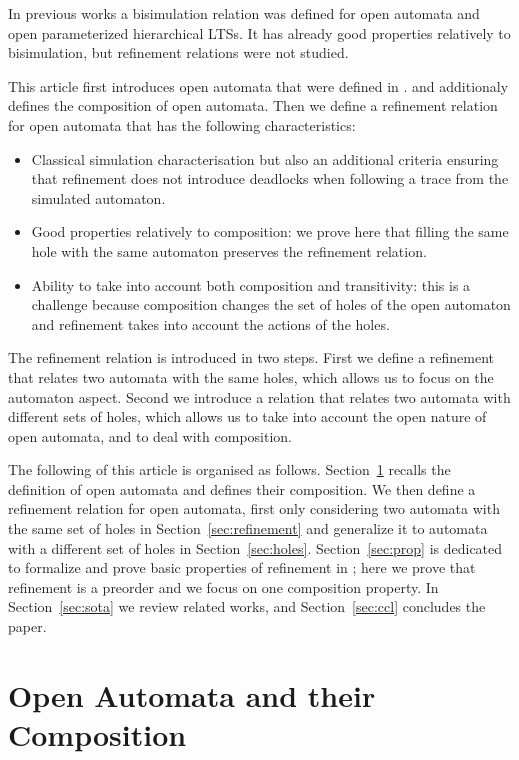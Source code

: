 \documentclass[runningheads]{llncs}
\begin{document}
In previous works \cite{fhbisim,wang:03126313} a bisimulation relation was defined for open automata and open parameterized hierarchical LTSs. It has already good properties relatively to bisimulation, but refinement relations were not studied.

This article first introduces open automata that were defined in  \cite{henrio:01299562}. %
and additionaly defines the composition of open automata.
Then we define  a refinement relation for open automata that has the following characteristics:
\begin{itemize}
\item Classical simulation characterisation but also an additional criteria ensuring that refinement does not introduce deadlocks when following a trace from the simulated automaton.
\item Good properties relatively to composition: we prove here that filling the same hole  with the same automaton preserves the refinement relation.
\item Ability to take into account both composition and transitivity: this is a challenge because composition changes the set of holes of the open automaton and refinement takes into account the actions of the holes.
\end{itemize}
The refinement relation is introduced in two steps. First we define a refinement that relates two automata with the same holes, which allows us to focus on the automaton aspect. Second we introduce a relation that relates two automata with different sets of holes, which allows us to take into account the open nature of open automata, and to deal with composition.

The following of this article is organised as follows. 
Section~\ref{sec:background} recalls the definition of open automata and defines their composition. 
We  then  define a refinement relation for open automata, first only considering two automata with the same set of holes in Section~\ref{sec:refinement} and generalize it to automata with a different set of holes in Section~\ref{sec:holes}.  Section~\ref{sec:prop} is dedicated to formalize and prove basic properties of refinement in ; here we prove that refinement is a preorder and we focus on one composition property. 
In Section~\ref{sec:sota} we review related works, and Section~\ref{sec:ccl} concludes the paper.


\section{Open Automata and their Composition}\label{sec:background}
\end{document}
